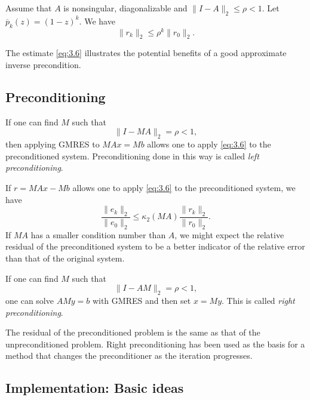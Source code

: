\begin{lemma}
  Assume that $A$ is nonsingular, diagonalizable and $\|I-A\|_2\leq \rho<1.$ Let
  $\overline{p}_k(z)=(1-z)^k.$
  We have
  \begin{equation}
    \label{eq:3.6}
    \|r_k\|_2\leq \rho^k\|r_0\|_2.
  \end{equation}
\end{lemma}

\begin{rmk}
  The estimate \eqref{eq:3.6} illustrates the potential benefits of a
  good approximate inverse precondition.
\end{rmk}

\subsection{Preconditioning}
\label{sec:3.3}

\begin{defi}
  If one can find $M$ such that $$\|I-MA\|_2=\rho<1,$$
  then applying GMRES to $MAx=Mb$ allows one to apply \eqref{eq:3.6}
  to the preconditioned system. Preconditioning done in this way is
  called \emph{left preconditioning}.
\end{defi}

\begin{rmk}
  If $r=MAx-Mb$ allows one to apply \eqref{eq:3.6} to the
  preconditioned system, we have
  $$\frac{\|e_k\|_2}{\|e_0\|_2}\leq
  \kappa_2(MA)\frac{\|r_k\|_2}{\|r_0\|_2}.$$
  If $MA$ has a smaller condition number than $A$, we might expect the
  relative residual of the preconditioned system to be a better
  indicator of the relative error than that of the original system.
\end{rmk}

\begin{defi}
    If one can find $M$ such that $$\|I-AM\|_2=\rho<1,$$
  one can solve $AMy=b$ with GMRES and then set $x=My.$
  This is called \emph{right preconditioning}.
\end{defi}

\begin{rmk}
  The residual of the preconditioned problem is the same as that of
  the unpreconditioned problem. Right preconditioning has been used as
  the basis for a method that changes the preconditioner as the
  iteration progresses.  
\end{rmk}

\subsection{Implementation: Basic ideas}
\label{sec:3.4}

